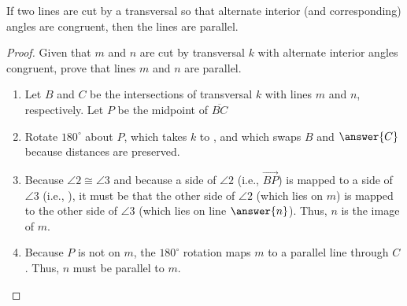 \documentclass[nooutcomes]{ximera}
\begin{document}
\begin{theorem}
If two lines are cut by a transversal so that alternate interior (and corresponding) angles are congruent, then the lines are parallel. 
\end{theorem}

\begin{proof}
Given that $m$ and $n$ are cut by transversal $k$ with alternate interior angles congruent, prove that lines $m$ and $n$ are parallel.  

\begin{image}
\end{image}

\begin{enumerate}
\item Let $B$ and $C$ be the intersections of transversal $k$ with lines $m$ and $n$, respectively. Let $P$ be the midpoint of $\overline{BC}$
\item Rotate $180^\circ$ about $P$, which takes $k$ to , and which swaps $B$ and $\answer{C}$ because distances are preserved.  
\item Because $\angle 2 \cong \angle 3$ and because a side of $\angle 2$ (i.e., $\overrightarrow{BP}$) is mapped to a side of $\angle 3$ (i.e., ), it must be that the other side of $\angle 2$ (which lies on $m$) is mapped to the other side of $\angle 3$ (which lies on line $\answer{n}$).  Thus, $n$ is the image of $m$.  
\item Because $P$ is not on $m$, the $180^\circ$ rotation maps $m$ to a parallel line through $C$.  Thus, $n$ must be parallel to $m$.  
\end{enumerate}
\end{proof}
\end{document}
